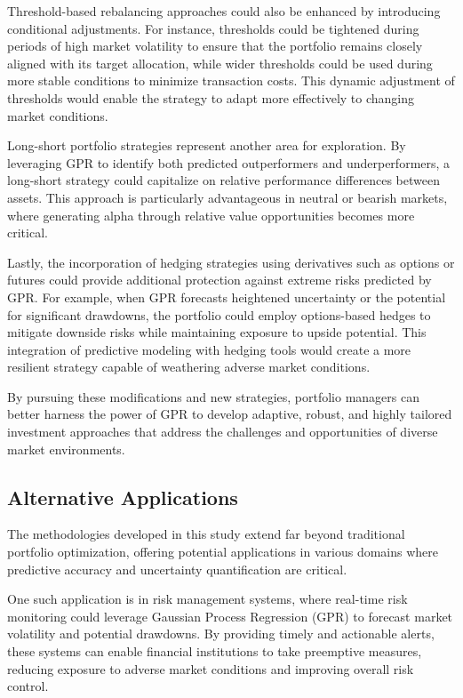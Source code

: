Threshold-based rebalancing approaches could also be enhanced by introducing conditional adjustments. For instance, thresholds could be tightened during periods of high market volatility to ensure that the portfolio remains closely aligned with its target allocation, while wider thresholds could be used during more stable conditions to minimize transaction costs. This dynamic adjustment of thresholds would enable the strategy to adapt more effectively to changing market conditions.

Long-short portfolio strategies represent another area for exploration. By leveraging GPR to identify both predicted outperformers and underperformers, a long-short strategy could capitalize on relative performance differences between assets. This approach is particularly advantageous in neutral or bearish markets, where generating alpha through relative value opportunities becomes more critical.

Lastly, the incorporation of hedging strategies using derivatives such as options or futures could provide additional protection against extreme risks predicted by GPR. For example, when GPR forecasts heightened uncertainty or the potential for significant drawdowns, the portfolio could employ options-based hedges to mitigate downside risks while maintaining exposure to upside potential. This integration of predictive modeling with hedging tools would create a more resilient strategy capable of weathering adverse market conditions.

By pursuing these modifications and new strategies, portfolio managers can better harness the power of GPR to develop adaptive, robust, and highly tailored investment approaches that address the challenges and opportunities of diverse market environments.

\subsection{Alternative Applications}
The methodologies developed in this study extend far beyond traditional portfolio optimization, offering potential applications in various domains where predictive accuracy and uncertainty quantification are critical.

One such application is in risk management systems, where real-time risk monitoring could leverage Gaussian Process Regression (GPR) to forecast market volatility and potential drawdowns. By providing timely and actionable alerts, these systems can enable financial institutions to take preemptive measures, reducing exposure to adverse market conditions and improving overall risk control.

